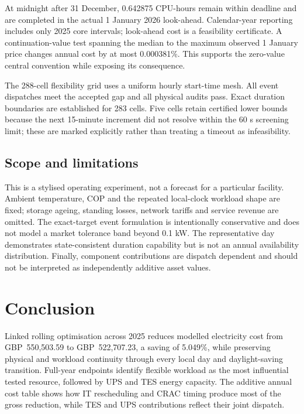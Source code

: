 At midnight after 31 December, 0.642875 CPU-hours remain within deadline and
are completed in the actual 1 January 2026 look-ahead. Calendar-year reporting
includes only 2025 core intervals; look-ahead cost is a feasibility certificate.
A continuation-value test spanning the median to the maximum observed 1 January
price changes annual cost by at most 0.000381\%. This supports the zero-value
central convention while exposing its consequence.

The 288-cell flexibility grid uses a uniform hourly start-time mesh. All event
dispatches meet the accepted gap and all physical audits pass. Exact duration
boundaries are established for 283 cells. Five cells retain certified lower
bounds because the next 15-minute increment did not resolve within the 60 s
screening limit; these are marked explicitly rather than treating a timeout as
infeasibility.

\subsection{Scope and limitations}

This is a stylised operating experiment, not a forecast for a particular
facility. Ambient temperature, COP and the repeated local-clock workload shape
are fixed; storage ageing, standing losses, network tariffs and service revenue
are omitted. The exact-target event formulation is intentionally conservative
and does not model a market tolerance band beyond 0.1 kW. The representative
day demonstrates state-consistent duration capability but is not an annual
availability distribution. Finally, component contributions are dispatch
dependent and should not be interpreted as independently additive asset values.

\section{Conclusion}

Linked rolling optimisation across 2025 reduces modelled electricity cost from
GBP~550,503.59 to GBP~522,707.23, a saving of 5.049\%, while preserving physical
and workload continuity through every local day and daylight-saving transition.
Full-year endpoints identify flexible workload as the most influential tested
resource, followed by UPS and TES energy capacity. The additive annual cost
table shows how IT rescheduling and CRAC timing produce most of the gross
reduction, while TES and UPS contributions reflect their joint dispatch.

